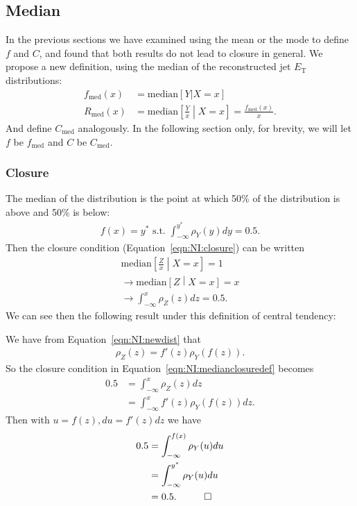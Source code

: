 \subsection{Median}
\label{sec:NI:median}
In the previous sections we have examined using the mean or the mode to define $f$ and $C$, and found that both results do not lead to closure in general. We propose a new definition, using the median of the reconstructed jet $E_\text{T}$ distributions:
\begin{align}
f_\text{med}(x)&=\text{median}[Y|X=x]\\
R_\text{med}(x) &= \text{median}\left[\frac{Y}{x}\middle| X=x\right] = \frac{f_\text{med}(x)}{x}. 
\end{align}
And define $C_\text{med}$ analogously.  In the following section only, for brevity, we will let $f$ be $f_\text{med}$ and $C$ be $C_\text{med}$.
\subsubsection{Closure}
\label{sec:NI:medianclosuresection}
The median of the distribution is the point at which 50\% of the distribution is above and 50\% is below:
\begin{align}
f(x) = y^* \text{ s.t. } \int_{-\infty}^{y^*} \rho_Y(y) dy = 0.5.
\end{align}
Then the closure condition (Equation~\ref{eqn:NI:closure}) can be written
\begin{align}
\text{median}\left[\frac{Z}{x}\middle| X=x\right] = 1\nonumber\\
\rightarrow \text{median}\left[Z\middle| X=x\right] = x\nonumber\\
\rightarrow \int_{-\infty}^{x} \rho_Z(z) dz = 0.5.
\label{eqn:NI:medianclosuredef}
\end{align}
We can see then the following result under this definition of central tendency:

\vspace{5mm}


\vspace{5mm}

 We have from Equation~\ref{eqn:NI:newdist} that
\begin{align}
\rho_Z(z) = f'(z)\rho_Y(f(z)).
\end{align}
So the closure condition in Equation~\ref{eqn:NI:medianclosuredef} becomes
\begin{align}
0.5 &= \int_{-\infty}^{x} \rho_Z(z) dz\nonumber\\
&=\int_{-\infty}^{x} f'(z)\rho_Y(f(z)) dz.
\end{align}
Then with $u = f(z), du = f'(z) dz$ we have
\begin{align}
0.5 &= \int_{-\infty}^{f(x)} \rho_Y(u) du\nonumber\\
&=\int_{-\infty}^{y^*} \rho_Y(u) du\nonumber\\
&=0.5. \hspace{1 cm} \Box
\end{align}

